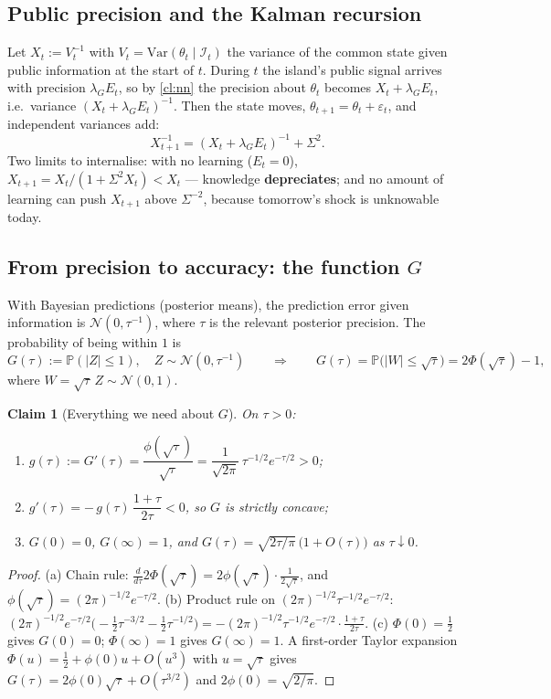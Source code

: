\documentclass[11pt,a4paper]{article}
\newtheorem{claim}{Claim}[section]
\theoremstyle{definition}
\theoremstyle{remark}
\newcommand{\Prob}{\mathbb{P}}
\newcommand{\N}{\mathcal{N}}
\newcommand{\lG}{\lambda_G}
\begin{document}
\subsection{Public precision and the Kalman recursion}
Let $X_t:=V_t^{-1}$ with $V_t=\mathrm{Var}(\theta_t\mid\mathcal I_t)$ the variance of the common state given
public information at the start of $t$. During $t$ the island's public signal arrives with precision
$\lG E_t$, so by \cref{cl:nn} the precision about $\theta_t$ becomes $X_t+\lG E_t$, i.e.\ variance
$(X_t+\lG E_t)^{-1}$. Then the state moves, $\theta_{t+1}=\theta_t+\varepsilon_t$, and independent variances
add:
\begin{equation}\label{eq:kalman}
X_{t+1}^{-1}=(X_t+\lG E_t)^{-1}+\Sigma^2. \tag{3}
\end{equation}
Two limits to internalise: with no learning ($E_t=0$), $X_{t+1}=X_t/(1+\Sigma^2X_t)<X_t$ --- knowledge
\textbf{depreciates}; and no amount of learning can push $X_{t+1}$ above $\Sigma^{-2}$, because tomorrow's
shock is unknowable today.

\subsection{From precision to accuracy: the function $G$}
With Bayesian predictions (posterior means), the prediction error given information is $\N(0,\tau^{-1})$,
where $\tau$ is the relevant posterior precision. The probability of being within $1$ is
\begin{equation}\label{eq:G}
G(\tau):=\Prob(|Z|\le1),\quad Z\sim\N(0,\tau^{-1})
\qquad\Longrightarrow\qquad
G(\tau)=\Prob\bigl(|W|\le\sqrt\tau\bigr)=2\Phi(\sqrt\tau)-1,
\end{equation}
where $W=\sqrt\tau\,Z\sim\N(0,1)$.

\begin{claim}[Everything we need about $G$]\label{cl:G}
On $\tau>0$:
\begin{enumerate}[label=(\alph*),nosep]
\item $g(\tau):=G'(\tau)=\dfrac{\phi(\sqrt\tau)}{\sqrt\tau}=\dfrac{1}{\sqrt{2\pi}}\,\tau^{-1/2}e^{-\tau/2}>0$;
\item $g'(\tau)=-\,g(\tau)\,\dfrac{1+\tau}{2\tau}<0$, so $G$ is strictly concave;
\item $G(0)=0$, $G(\infty)=1$, and $G(\tau)=\sqrt{2\tau/\pi}\,\bigl(1+O(\tau)\bigr)$ as $\tau\downarrow0$.
\end{enumerate}
\end{claim}
\begin{proof}
(a) Chain rule: $\frac{d}{d\tau}2\Phi(\sqrt\tau)=2\phi(\sqrt\tau)\cdot\frac{1}{2\sqrt\tau}$, and
$\phi(\sqrt\tau)=(2\pi)^{-1/2}e^{-\tau/2}$.
(b) Product rule on $(2\pi)^{-1/2}\tau^{-1/2}e^{-\tau/2}$:
$(2\pi)^{-1/2}e^{-\tau/2}\bigl(-\tfrac12\tau^{-3/2}-\tfrac12\tau^{-1/2}\bigr)
=-(2\pi)^{-1/2}\tau^{-1/2}e^{-\tau/2}\cdot\frac{1+\tau}{2\tau}$.
(c) $\Phi(0)=\tfrac12$ gives $G(0)=0$; $\Phi(\infty)=1$ gives $G(\infty)=1$. A first-order Taylor expansion
$\Phi(u)=\tfrac12+\phi(0)u+O(u^3)$ with $u=\sqrt\tau$ gives $G(\tau)=2\phi(0)\sqrt\tau+O(\tau^{3/2})$ and
$2\phi(0)=\sqrt{2/\pi}$.
\end{proof}
\end{document}
